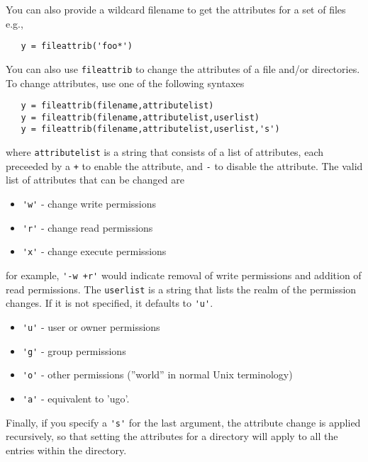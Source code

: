 You can also provide a wildcard filename to get the attributes for a set of files
e.g.,
\begin{verbatim}
   y = fileattrib('foo*')
\end{verbatim}

You can also use \verb|fileattrib| to change the attributes of a file and/or directories.
To change attributes, use one of the following syntaxes
\begin{verbatim}
   y = fileattrib(filename,attributelist)
   y = fileattrib(filename,attributelist,userlist)
   y = fileattrib(filename,attributelist,userlist,'s')
\end{verbatim}
where \verb|attributelist| is a string that consists of a list of attributes, each preceeded by 
a \verb|+| to enable the attribute, and \verb|-| to disable the attribute. The valid list of
attributes that can be changed are
\begin{itemize}
\item  \verb|'w'| - change write permissions

\item  \verb|'r'| - change read permissions

\item  \verb|'x'| - change execute permissions

\end{itemize}
for example, \verb|'-w +r'| would indicate removal of write permissions and addition of read
permissions.  The \verb|userlist| is a string that lists the realm of the permission changes.
If it is not specified, it defaults to \verb|'u'|.
\begin{itemize}
\item  \verb|'u'| - user or owner permissions

\item  \verb|'g'| - group permissions

\item  \verb|'o'| - other permissions (''world'' in normal Unix terminology)

\item  \verb|'a'| - equivalent to 'ugo'.

\end{itemize}
Finally, if you specify a \verb|'s'| for the last argument, the attribute change is applied
recursively, so that setting the attributes for a directory will apply to all the entries
within the directory.
